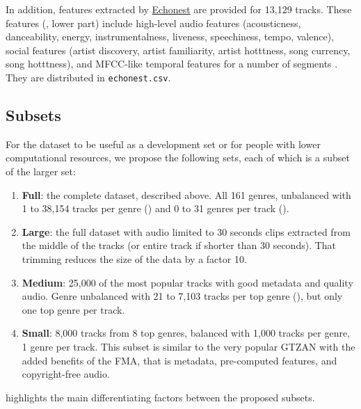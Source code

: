 \documentclass{article}
\newcommand{\ngenres}{161 }
\begin{document}
In addition,
features extracted by \href{http://the.echonest.com/}{Echonest} are provided for 13,129 tracks. These features (, lower part) include high-level audio features (acousticness, danceability, energy, instrumentalness, liveness, speechiness, tempo, valence), social features (artist discovery, artist familiarity, artist hotttness, song currency, song hotttness), and MFCC-like temporal features for a number of segments \cite{echonest_temporal}. They are distributed in \texttt{echonest.csv}.

\subsection{Subsets} \label{sec:subsets}

For the dataset to be useful as a development set or for people with lower computational resources, we propose the following sets, each of which is a subset of the larger set:
\begin{enumerate}
	\item \textbf{Full}: the complete dataset, described above. All \ngenres genres, unbalanced with 1 to 38,154 tracks per genre () and 0 to 31 genres per track ().
	\item \textbf{Large}: the full dataset with audio limited to 30 seconds clips extracted from the middle of the tracks (or entire track if shorter than 30 seconds). That trimming reduces the size of the data by a factor 10.
	\item \textbf{Medium}: 25,000 of the most popular tracks with good metadata and quality audio. Genre unbalanced with 21 to 7,103 tracks per top genre (), but only one top genre per track.
	\item \textbf{Small}: 8,000 tracks from 8 top genres, balanced with 1,000 tracks per genre, 1 genre per track. This subset is similar to the very popular GTZAN \cite{gtzan} with the added benefits of the FMA, that is metadata, pre-computed features, and copyright-free audio.
\end{enumerate}
 highlights the main differentiating factors between the proposed subsets.
\end{document}
